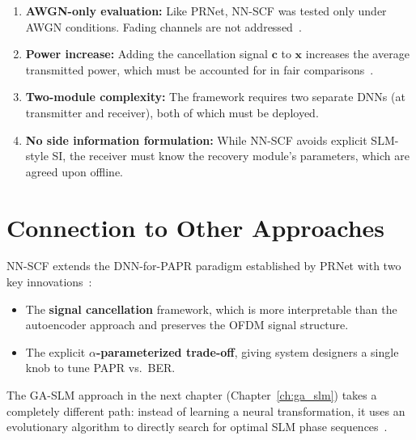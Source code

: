 \begin{enumerate}
    \item \textbf{AWGN-only evaluation:}
          Like PRNet, NN-SCF was tested only under AWGN conditions.
          Fading channels are not addressed~\cite{zou2021novel}.

    \item \textbf{Power increase:}
          Adding the cancellation signal $\bm{c}$ to $\bm{x}$
          increases the average transmitted power, which must be
          accounted for in fair comparisons~\cite{zou2021novel}.

    \item \textbf{Two-module complexity:}
          The framework requires two separate DNNs (at transmitter and
          receiver), both of which must be deployed.

    \item \textbf{No side information formulation:}
          While NN-SCF avoids explicit SLM-style SI,
          the receiver must know the recovery module's parameters,
          which are agreed upon offline.
\end{enumerate}


\section{Connection to Other Approaches}
\label{sec:nnscf_connections}

NN-SCF extends the DNN-for-PAPR paradigm established by PRNet with two
key innovations~\cite{zou2021novel}:
\begin{itemize}
    \item The \textbf{signal cancellation} framework, which is more
          interpretable than the autoencoder approach and preserves
          the OFDM signal structure.
    \item The explicit \textbf{$\alpha$-parameterized trade-off},
          giving system designers a single knob to tune PAPR vs.\ BER.
\end{itemize}

The GA-SLM approach in the next chapter (Chapter~\ref{ch:ga_slm})
takes a completely different path: instead of learning a neural
transformation, it uses an evolutionary algorithm to directly search
for optimal SLM phase sequences~\cite{ali2016new}.

